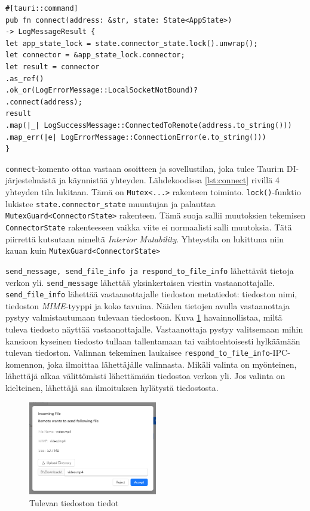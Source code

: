 \documentclass[a4paper,12pt]{article}
\begin{document}
    \begin{lstlisting}[basicstyle=\small\ttfamily,caption={'connect'-komento}, label={lst:connect}]
#[tauri::command]
pub fn connect(address: &str, state: State<AppState>)
-> LogMessageResult {
let app_state_lock = state.connector_state.lock().unwrap();
let connector = &app_state_lock.connector;
let result = connector
.as_ref()
.ok_or(LogErrorMessage::LocalSocketNotBound)?
.connect(address);
result
.map(|_| LogSuccessMessage::ConnectedToRemote(address.to_string()))
.map_err(|e| LogErrorMessage::ConnectionError(e.to_string()))
}
    \end{lstlisting}


    \lstinline{connect}-komento ottaa vastaan osoitteen ja sovellustilan, joka tulee Tauri:n DI-järjestelmästä ja käynnistää yhteyden. Lähdekoodissa \ref{lst:connect} rivillä 4 yhteyden tila lukitaan.
    Tämä on \lstinline{Mutex<...>} rakenteen toiminto. \lstinline{lock()}-funktio lukistee \lstinline{state.connector_state} muuntujan ja palauttaa \lstinline{MutexGuard<ConnectorState>} rakenteen. Tämä suoja sallii muutoksien tekemisen \lstinline{ConnectorState} rakenteeseen vaikka viite ei normaalisti salli muutoksia. Tätä piirrettä kutsutaan nimeltä \textit{Interior Mutability}. Yhteystila on lukittuna niin kauan kuin \lstinline{MutexGuard<ConnectorState>} \par

    \lstinline{send_message, send_file_info ja respond_to_file_info} lähettävät tietoja verkon yli. \lstinline{send_message} lähettää yksinkertaisen viestin vastaanottajalle.
    \lstinline{send_file_info} lähettää vastaanottajalle tiedoston metatiedot: tiedoston nimi, tiedoston \textit{MIME}-tyyppi ja koko tavuina. Näiden tietojen avulla vastaanottaja pystyy valmistautumaan tulevaan tiedostoon. Kuva \ref{fig:incoming_file} havainnollistaa, miltä tuleva tiedosto näyttää vastaanottajalle. Vastaanottaja pystyy valitsemaan mihin kansioon kyseinen tiedosto tullaan tallentamaan tai vaihtoehtoisesti hylkäämään tulevan tiedoston. Valinnan tekeminen laukaisee \lstinline{respond_to_file_info}-IPC-komennon, joka ilmoittaa lähettäjälle valinnasta.
    Mikäli valinta on myönteinen, lähettäjä alkaa välittömästi lähettämään tiedostoa verkon yli. Jos valinta on kielteinen, lähettäjä saa ilmoituksen hylätystä tiedostosta.

    \begin{figure}[h!]
        \centering
        \includegraphics[width=0.5\textwidth]{doc/latex/src/images/incoming_file.png}
        \caption{Tulevan tiedoston tiedot}
        \label{fig:incoming_file}
    \end{figure}
\end{document}
